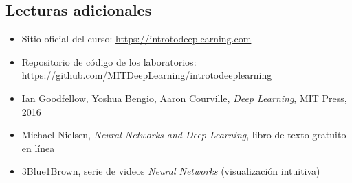\subsection{Lecturas adicionales}

\begin{itemize}
\item Sitio oficial del curso: \url{https://introtodeeplearning.com}
\item Repositorio de código de los laboratorios: \url{https://github.com/MITDeepLearning/introtodeeplearning}
\item Ian Goodfellow, Yoshua Bengio, Aaron Courville, \textit{Deep Learning}, MIT Press, 2016
\item Michael Nielsen, \textit{Neural Networks and Deep Learning}, libro de texto gratuito en línea
\item 3Blue1Brown, serie de videos \textit{Neural Networks} (visualización intuitiva)
\end{itemize}




